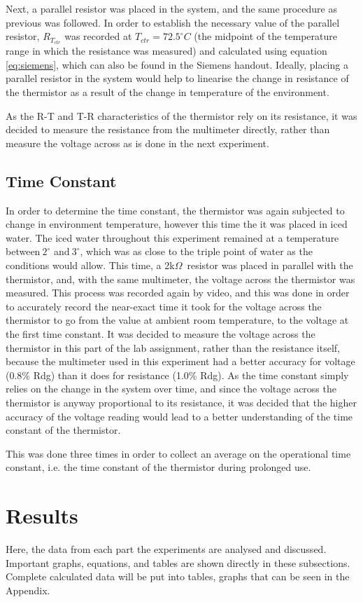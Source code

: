 \documentclass[a4,11pt]{article}
\begin{document}
Next, a parallel resistor was placed in the system, and the same procedure as previous was followed. In order to establish the necessary value of the parallel resistor, $R_{T_{ctr}}$ was recorded at $T_{ctr}=72.5^{\circ}C$ (the midpoint of the temperature range in which the resistance was measured) and calculated using equation \ref{eq:siemens}, which can also be found in the Siemens handout. Ideally, placing a parallel resistor in the system would help to linearise the change in resistance of the thermistor as a result of the change in temperature of the environment.

As the R-T and T-R characteristics of the thermistor rely on its resistance, it was decided to measure the resistance from the multimeter directly, rather than measure the voltage across as is done in the next experiment.
\subsection{Time Constant}
In order to determine the time constant, the thermistor was again subjected to change in environment temperature, however this time the it was placed in iced water. The iced water throughout this experiment remained at a temperature between$~2^{\circ}$ and$~3^{\circ}$, which was as close to the triple point of water as the conditions would allow. This time, a 2k$\Omega$\ resistor was placed in parallel with the thermistor, and, with the same multimeter, the voltage across the thermistor was measured. This process was recorded again by video, and this was done in order to accurately record the near-exact time it took for the voltage across the thermistor to go from the value at ambient room temperature, to the voltage at the first time constant. It was decided to measure the voltage across the thermistor in this part of the lab assignment, rather than the resistance itself, because the multimeter used in this experiment had a better accuracy for voltage (0.8\% Rdg) than it does for resistance (1.0\% Rdg). As the time constant simply relies on the change in the system over time, and since the voltage across the thermistor is anyway proportional to its resistance, it was decided that the higher accuracy of the voltage reading would lead to a better understanding of the time constant of the thermistor.

This was done three times in order to collect an average on the operational time constant, i.e. the time constant of the thermistor during prolonged use.
\section{Results}
Here, the data from each part the experiments are analysed and discussed. Important graphs, equations, and tables are shown directly in these subsections. Complete calculated data will be put into tables, graphs that can be seen in the Appendix.
\end{document}
